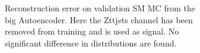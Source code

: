 \begin{figure}[h!]
\begin{subfigure}{.45\textwidth}
        \caption{Reconstruction error on validation SM MC from the big Autoencoder. Here the Zttjets channel has been removed from training and 
        is used as signal. No significant difference in distributions are found. }
        \label{fig:vae_big_Zttjets}
    \end{subfigure}
    \hfill  
    \caption{ }
    \label{fig:vae_big_channel5}
\end{figure}